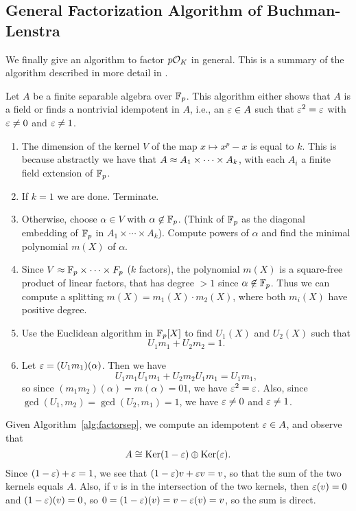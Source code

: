 \subsection{General Factorization Algorithm of Buchman-Lenstra}

We finally give an algorithm to factor $p\mathcal{O}_K$ in general. This is a
summary of the algorithm described in more detail in
\cite[\S6.2]{cohen:course_ant}.

\begin{algorithm}\label{alg:factorsep}
	Let $A$ be a finite separable algebra over $\mathbb{F}_p$.  This
	algorithm either shows that $A$ is a field or finds
	a nontrivial idempotent in $A$, i.e., an $\varepsilon\in A$
	such that $\varepsilon^2 = \varepsilon$ with $\varepsilon\neq 0$ and $\varepsilon\neq 1$.
	\begin{enumerate}
		\item The dimension of the kernel $V$ of the map $x\mapsto x^p - x$ is
		equal to $k$.  This is because abstractly we have that $A\approx
		A_1\times \cdots \times A_k$, with each $A_i$ a finite field
		extension of $\mathbb{F}_p$.
		\item If $k=1$ we are done.  Terminate.
		\item Otherwise, choose $\alpha \in V$ with $\alpha \not\in \mathbb{F}_p$.
		(Think of $\mathbb{F}_p$ as the diagonal embedding of $\mathbb{F}_p$ in
		$A_1\times \cdots \times A_k$).
		Compute powers of $\alpha$ and find the minimal polynomial $m(X)$
		of $\alpha$.
		\item Since $V\approx \mathbb{F}_p \times \cdots \times F_p$ ($k$ factors),
		the polynomial $m(X)$ is a square-free product of linear factors, that
		has degree $>1$ since $\alpha\not\in\mathbb{F}_p$.  Thus we can compute
		a splitting $m(X) = m_1(X) \cdot m_2(X)$, where both $m_i(X)$ have
		positive degree.
		\item Use the Euclidean algorithm in $\mathbb{F}_p[X]$ to find
		$U_1(X)$ and $U_2(X)$ such that
		$$
			U_1 m_1 + U_2 m_2 = 1.
		$$
		\item Let $\varepsilon = (U_1 m_1)(\alpha)$.  Then we have
		$$
			U_1 m_1 U_1 m_1 + U_2 m_2 U_1 m_1 = U_1 m_1,
		$$
		so since $(m_1 m_2)(\alpha) = m(\alpha)=01$, we have $\varepsilon^2 = \varepsilon$.
		Also, since $\gcd(U_1, m_2) = \gcd(U_2, m_1) = 1$,
		we have $\varepsilon\neq 0$ and $\varepsilon \neq 1$.
	\end{enumerate}
\end{algorithm}

Given Algorithm~\ref{alg:factorsep}, we compute an idempotent
$\varepsilon \in A$, and observe that
$$
	A \cong \operatorname{Ker}(1 - \varepsilon)  \oplus \operatorname{Ker}(\varepsilon).
$$
Since $(1 - \varepsilon) + \varepsilon = 1$, we see that
$(1 - \varepsilon)v + \varepsilon v = v$, so that the sum
of the two kernels equals $A$.
Also, if $v$ is in the intersection of the two kernels,
then $\varepsilon(v) = 0$ and $(1-\varepsilon)(v) =0$, so
$0 = (1-\varepsilon)(v) = v - \varepsilon(v) = v$, so the sum is direct.

